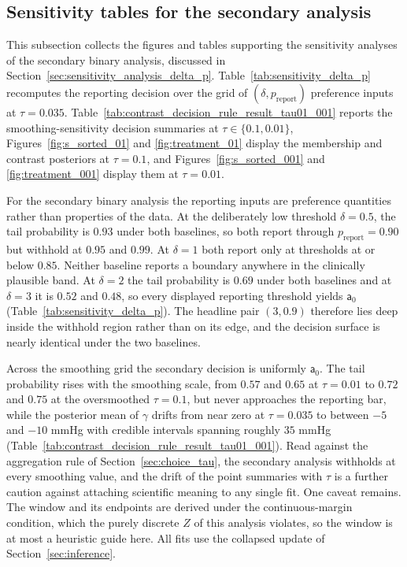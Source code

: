 \documentclass[11pt]{article}
\theoremstyle{definition}
\theoremstyle{plain}
\begin{document}
\subsection{Sensitivity tables for the secondary analysis}
This subsection collects the figures and tables supporting the sensitivity analyses of the secondary binary analysis, discussed in Section~\ref{sec:sensitivity_analysis_delta_p}. Table~\ref{tab:sensitivity_delta_p} recomputes the reporting decision over the grid of $(\delta,p_{\mathrm{report}})$ preference inputs at $\tau=0.035$. Table~\ref{tab:contrast_decision_rule_result_tau01_001} reports the smoothing-sensitivity decision summaries at $\tau\in\{0.1,0.01\}$, Figures~\ref{fig:s_sorted_01} and \ref{fig:treatment_01} display the membership and contrast posteriors at $\tau=0.1$, and Figures~\ref{fig:s_sorted_001} and \ref{fig:treatment_001} display them at $\tau=0.01$.

For the secondary binary analysis the reporting inputs are preference quantities rather than properties of the data. At the deliberately low threshold $\delta=0.5$, the tail probability is $0.93$ under both baselines, so both report through $p_{\mathrm{report}}=0.90$ but withhold at $0.95$ and $0.99$. At $\delta=1$ both report only at thresholds at or below $0.85$. Neither baseline reports a boundary anywhere in the clinically plausible band. At $\delta=2$ the tail probability is $0.69$ under both baselines and at $\delta=3$ it is $0.52$ and $0.48$, so every displayed reporting threshold yields $\mathsf a_0$ (Table~\ref{tab:sensitivity_delta_p}). The headline pair $(3,0.9)$ therefore lies deep inside the withhold region rather than on its edge, and the decision surface is nearly identical under the two baselines.

Across the smoothing grid the secondary decision is uniformly $\mathsf a_0$. The tail probability rises with the smoothing scale, from $0.57$ and $0.65$ at $\tau=0.01$ to $0.72$ and $0.75$ at the oversmoothed $\tau=0.1$, but never approaches the reporting bar, while the posterior mean of $\gamma$ drifts from near zero at $\tau=0.035$ to between $-5$ and $-10$ mmHg with credible intervals spanning roughly $35$ mmHg (Table~\ref{tab:contrast_decision_rule_result_tau01_001}). Read against the aggregation rule of Section~\ref{sec:choice_tau}, the secondary analysis withholds at every smoothing value, and the drift of the point summaries with $\tau$ is a further caution against attaching scientific meaning to any single fit. One caveat remains. The window and its endpoints are derived under the continuous-margin condition, which the purely discrete $Z$ of this analysis violates, so the window is at most a heuristic guide here. All fits use the collapsed update of Section~\ref{sec:inference}.
\end{document}
